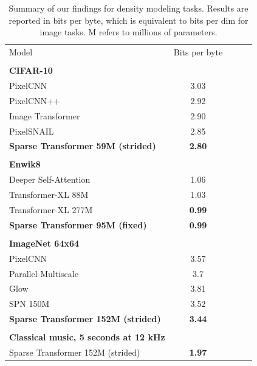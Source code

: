 \documentclass{article}
\begin{document}
\begin{table}[t]
\caption{Summary of our findings for density modeling tasks. Results are reported in bits per byte, which is equivalent to bits per dim for image tasks. M refers to millions of parameters.}
\label{all_results}
\vskip 0.15in
\begin{center}
\begin{small}
\begin{tabular}{lcccr}
\toprule
Model & Bits per byte\\
\quad \\

\textbf{CIFAR-10}\\
\midrule
PixelCNN \cite{oord2016pixel} & 3.03\\
PixelCNN++ \cite{salimans2017pixelcnn++} & 2.92\\
Image Transformer \cite{parmar2018image} & 2.90\\
PixelSNAIL \cite{chen2017pixelsnail} & 2.85\\
\textbf{Sparse Transformer 59M (strided)} & \textbf{2.80} \\

\quad \\
\textbf{Enwik8}\\
\midrule
Deeper Self-Attention \cite{al2018character} & 1.06\\
Transformer-XL 88M \cite{dai2018transformer} & 1.03 \\
Transformer-XL 277M \cite{dai2018transformer} & \textbf{0.99}\\
\textbf{Sparse Transformer 95M (fixed)} & \textbf{0.99}\\

\quad \\
\textbf{ImageNet 64x64}\\
\midrule
PixelCNN \cite{oord2016pixel} & 3.57 \\
Parallel Multiscale \cite{reed2017parallel} & 3.7 \\
Glow \cite{kingma2018glow} & 3.81 \\
SPN 150M \cite{menick2018generating} & 3.52 \\
\textbf{Sparse Transformer 152M (strided)} & \textbf{3.44} \\

\quad \\
\textbf{Classical music, 5 seconds at 12 kHz} \\
\midrule
Sparse Transformer 152M (strided) & \textbf{1.97} \\

\bottomrule
\end{tabular}
\end{small}
\end{center}
\vskip -0.1in
\end{table}
\end{document}
